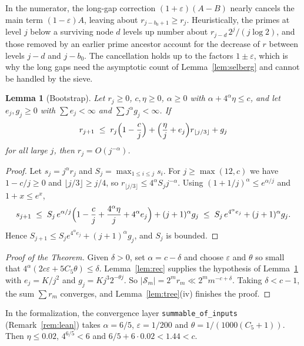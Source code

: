 \documentclass[11pt]{amsart}
\newtheorem{lemma}{Lemma}[section]
\newcommand{\Sset}{\mathcal{S}}
\begin{document}
In the numerator, the long-gap correction $(1+\varepsilon)(A - B)$
nearly cancels the main term $(1-\varepsilon)A$, leaving about
$r_{j-b_0+1} \ge r_j$. Heuristically, the primes at level $j$ below a
surviving node $d$ levels up number about $r_{j-d}\, 2^j/(j\log 2)$, and
those removed by an earlier prime ancestor account for the decrease of $r$
between levels $j-d$ and $j - b_0$. The cancellation holds up to the
factors $1 \pm \varepsilon$, which is why the long gaps need the
asymptotic count of Lemma~\ref{lem:selberg} and cannot be handled by the
sieve.

\begin{lemma}[Bootstrap]
\label{lem:boot}
Let $r_j \ge 0$, $c, \eta \ge 0$, $\alpha \ge 0$ with $\alpha + 4^\alpha
\eta \le c$, and let $e_j, g_j \ge 0$ with $\sum e_j < \infty$ and $\sum
j^\alpha g_j < \infty$. If
\[
r_{j+1} \;\le\; r_j\Bigl(1 - \frac{c}{j}\Bigr) + \Bigl(\frac{\eta}{j} +
e_j\Bigr) r_{\lfloor j/3\rfloor} + g_j
\]
for all large $j$, then $r_j = O(j^{-\alpha})$.
\end{lemma}

\begin{proof}
Let $s_j = j^\alpha r_j$ and $S_j = \max_{1 \le i \le j} s_i$. For $j
\ge \max(12, c)$ we have $1 - c/j \ge 0$ and $\lfloor j/3 \rfloor \ge
j/4$, so $r_{\lfloor j/3\rfloor} \le 4^\alpha S_j j^{-\alpha}$. Using
$(1+1/j)^\alpha \le e^{\alpha/j}$ and $1 + x \le e^x$,
\[
s_{j+1} \;\le\; S_j\, e^{\alpha/j}\Bigl(1 - \frac{c}{j} +
\frac{4^\alpha\eta}{j} + 4^\alpha e_j\Bigr) + (j+1)^\alpha g_j
\;\le\; S_j\, e^{4^\alpha e_j} + (j+1)^\alpha g_j .
\]
Hence $S_{j+1} \le S_j e^{4^\alpha e_j} + (j+1)^\alpha g_j$, and $S_j$
is bounded.
\end{proof}

\begin{proof}[Proof of the Theorem]
Given $\delta > 0$, set $\alpha = c - \delta$ and choose $\varepsilon$ and
$\theta$ so small that $4^\alpha (2c\varepsilon + 5C_5\theta) \le
\delta$. Lemma~\ref{lem:rec} supplies the hypothesis of
Lemma~\ref{lem:boot} with $e_j = K/j^2$ and $g_j = K j^3 2^{-\theta j}$.
So $|\Sset_m| = 2^m r_m \ll 2^m m^{-c+\delta}$. Taking $\delta < c - 1$,
the sum $\sum r_m$ converges, and Lemma~\ref{lem:tree}(iv) finishes the
proof.
\end{proof}

In the formalization, the convergence layer \texttt{summable\_of\_inputs}
(Remark~\ref{rem:lean}) takes $\alpha = 6/5$, $\varepsilon = 1/200$ and
$\theta = 1/(1000(C_5+1))$. Then $\eta \le 0.02$, $4^{6/5} < 6$ and $6/5 + 6 \cdot 0.02 < 1.44 < c$.
\end{document}
